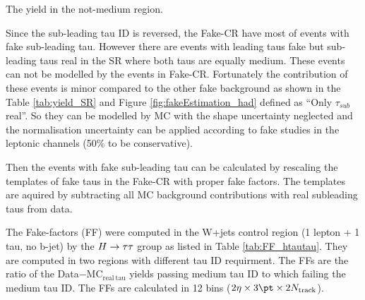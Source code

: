 \begin{table}
\caption{The yield in the not-medium region.}
\label{tab:hadronic_nm_yield}

\end{table}

Since the sub-leading tau ID is reversed, the Fake-CR have most of events with fake sub-leading tau. However there are events with leading taus fake but sub-leading taus real in the SR where both taus are equally medium. These events can not be modelled by the events in Fake-CR. Fortunately the contribution of these events is minor compared to the other fake background as shown in the Table \ref{tab:yield_SR} and Figure \ref{fig:fakeEstimation_had} defined as ``Only $\tau_{sub}$ real''. So they can be modelled by MC with the shape uncertainty neglected and the normalisation uncertainty can be applied according to fake studies in the leptonic channels (50\% to be conservative).

Then the events with fake sub-leading tau can be calculated by rescaling the templates of fake taus in the Fake-CR with proper fake factors. The templates are aquired by subtracting all MC background contributions with real subleading taus from data.

The Fake-factors (FF) were computed in the W+jets control region (1 lepton + 1 tau, no b-jet) by the $H \rightarrow \tau\tau$ group \cite{Htautau-note} as listed in Table \ref{tab:FF_htautau}. They are computed in two regions with different tau ID requirment. The FFs are the ratio of the Data$-$MC$_\mathrm{real~tau}$ yields passing medium tau ID to which failing the medium tau ID. The FFs are calculated in 12 bins ($2\eta\times3\pt\times2N_\mathrm{track}$).


